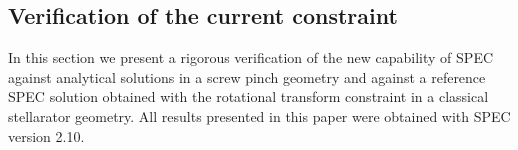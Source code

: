 \documentclass[my_thesis.tex]{subfiles}
\begin{document}
%
%
%
%
%


\subsection{Verification of the current constraint} \label{sec.verification}

In this section we present a rigorous verification of the new capability of \ac{SPEC} against analytical solutions in a screw pinch geometry and against a reference \ac{SPEC} solution obtained with the rotational transform constraint in a classical stellarator geometry. All results presented in this paper were obtained with \ac{SPEC} version 2.10.
\end{document}
